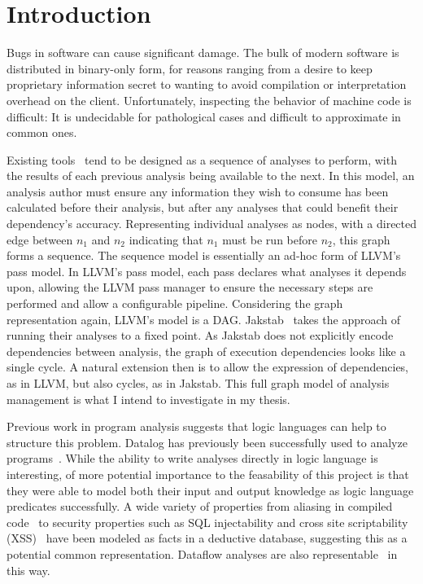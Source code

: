\chapter{Introduction}
Bugs in software can cause significant damage.
The bulk of modern software is distributed in binary-only form, for reasons ranging from a desire to keep proprietary information secret to wanting to avoid compilation or interpretation overhead on the client.
Unfortunately, inspecting the behavior of machine code is difficult:
It is undecidable for pathological cases and difficult to approximate in common ones.

Existing tools~\cite{ida, bap, bitblaze, bindead} tend to be designed as a sequence of analyses to perform, with the results of each previous analysis being available to the next.
In this model, an analysis author must ensure any information they wish to consume has been calculated before their analysis, but after any analyses that could benefit their dependency's accuracy.
Representing individual analyses as nodes, with a directed edge between $n_1$ and $n_2$ indicating that $n_1$ must be run before $n_2$, this graph forms a sequence.
The sequence model is essentially an ad-hoc form of LLVM\cite{llvm}'s pass model.
In LLVM's pass model, each pass declares what analyses it depends upon, allowing the LLVM pass manager to ensure the necessary steps are performed and allow a configurable pipeline.
Considering the graph representation again, LLVM's model is a DAG.
Jakstab~\cite{jakstab} takes the approach of running their analyses to a fixed point.
As Jakstab does not explicitly encode dependencies between analysis, the graph of execution dependencies looks like a single cycle.
A natural extension then is to allow the expression of dependencies, as in LLVM, but also cycles, as in Jakstab.
This full graph model of analysis management is what I intend to investigate in my thesis.

Previous work in program analysis suggests that logic languages can help to structure this problem.
Datalog has previously been successfully used to analyze programs~\cite{lam2005,brumley2006,alpuente2011,doop1,bddbddb}.
While the ability to write analyses directly in logic language is interesting, of more potential importance to the feasability of this project is that they were able to model both their input and output knowledge as logic language predicates successfully.
A wide variety of properties from aliasing in compiled code~\cite{brumley2006} to security properties such as SQL injectability and cross site scriptability (XSS)~\cite{lam2005} have been modeled as facts in a deductive database, suggesting this as a potential common representation.
Dataflow analyses are also representable~\cite{mcallester2002} in this way.

